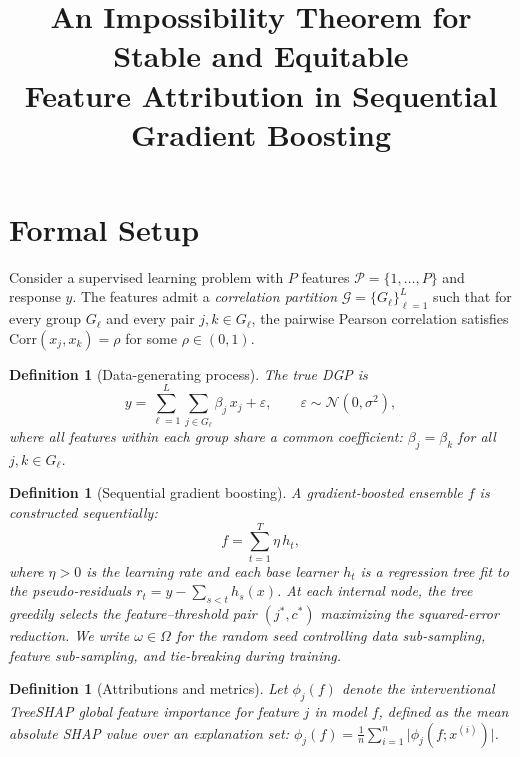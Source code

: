 \documentclass[11pt]{article}
\title{An Impossibility Theorem for Stable and Equitable\\
  Feature Attribution in Sequential Gradient Boosting}
\author{}
\date{}
\newtheorem{definition}[theorem]{Definition}
\theoremstyle{remark}
\newcommand{\feat}{\mathcal{P}}             %
\newcommand{\group}{\mathcal{G}}            %
\newcommand{\Gl}{G_\ell}                    %
\newcommand{\phij}{\phi_j}                  %
\newcommand{\totalT}{T}                     %
\newcommand{\rhovar}{\rho}                  %
\newcommand{\abs}[1]{\lvert #1 \rvert}
\begin{document}
\maketitle

\section{Formal Setup}
\label{sec:setup}

Consider a supervised learning problem with $P$ features
$\feat = \{1, \dots, P\}$ and response $y$.
The features admit a \emph{correlation partition}
$\group = \{\Gl\}_{\ell=1}^{L}$ such that for every group $\Gl$ and every
pair $j, k \in \Gl$, the pairwise Pearson correlation satisfies
$\mathrm{Corr}(x_j, x_k) = \rhovar$ for some $\rhovar \in (0, 1)$.

\begin{definition}[Data-generating process]
\label{def:dgp}
The true DGP is
\begin{equation}
  y = \sum_{\ell=1}^{L} \sum_{j \in \Gl} \beta_j\, x_j + \varepsilon,
  \qquad \varepsilon \sim \mathcal{N}(0, \sigma^2),
\end{equation}
where all features within each group share a common coefficient:
$\beta_j = \beta_k$ for all $j, k \in \Gl$.
\end{definition}

\begin{definition}[Sequential gradient boosting]
\label{def:sgb}
A gradient-boosted ensemble $f$ is constructed sequentially:
\begin{equation}
  f = \sum_{t=1}^{\totalT} \eta\, h_t,
\end{equation}
where $\eta > 0$ is the learning rate and each base learner $h_t$ is a
regression tree fit to the pseudo-residuals
$r_t = y - \sum_{s < t} h_s(x)$.
At each internal node, the tree greedily selects the feature--threshold pair
$(j^*, c^*)$ maximizing the squared-error reduction.
We write $\omega \in \Omega$ for the random seed controlling data
sub-sampling, feature sub-sampling, and tie-breaking during training.
\end{definition}

\begin{definition}[Attributions and metrics]
\label{def:attr}
Let $\phij(f)$ denote the interventional TreeSHAP global feature importance
for feature $j$ in model $f$, defined as the mean absolute SHAP value over
an explanation set:
$\phij(f) = \frac{1}{n} \sum_{i=1}^{n} \abs{\phi_j(f; x^{(i)})}$.
\end{definition}
\end{document}
